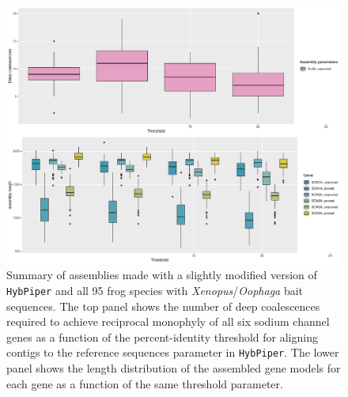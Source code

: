 \documentclass{article}
\begin{document}
\begin{figure}[h!]
    \centering
    \includegraphics[scale=0.5]{figures/summary_alignments.pdf}
    \caption{Summary of assemblies made with a slightly modified version of \texttt{HybPiper} and all 95 frog species with \textit{Xenopus}/\textit{Oophaga} bait sequences. The top panel shows the number of deep coalescences required to achieve reciprocal monophyly of all six sodium channel genes as a function of the percent-identity threshold for aligning contigs to the reference sequences parameter in \texttt{HybPiper}. The lower panel shows the length distribution of the assembled gene models for each gene as a function of the same threshold parameter.}
    \label{fig:my_label}
\end{figure}
\clearpage
\end{document}
